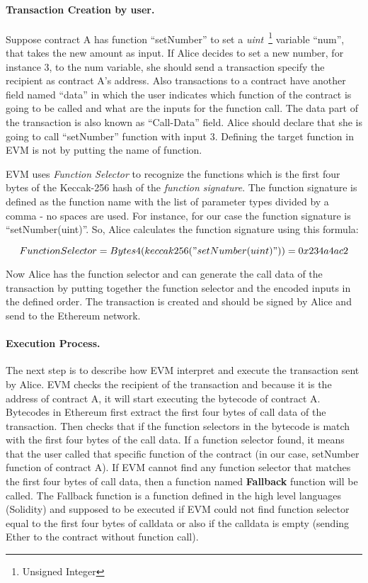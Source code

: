 \paragraph{Transaction Creation by user. }Suppose contract A has function ``setNumber'' to set a \textit{uint}~\footnote{Unsigned Integer} variable ``num'', that takes the new amount as input. If Alice decides to set a new number, for instance 3, to the num variable, she should send a transaction specify the recipient as contract A's address. Also transactions to a contract have another field named ``data'' in which the user indicates which function of the contract is going to be called and what are the inputs for the function call. The data part of the transaction is also known as ``Call-Data'' field. Alice should declare that she is going to call ``setNumber'' function with input 3. Defining the target function in EVM is not by putting the name of function. 

EVM uses \textit{Function Selector} to recognize the functions which is the first four bytes of the Keccak-256 hash of the \textit{function signature}. The function signature is defined as the function name with the list of parameter types divided by a comma - no spaces are used. For instance, for our case the function signature is ``setNumber(uint)''. So, Alice calculates the function signature using this formula:

\begin{equation}
    Function Selector = Bytes4(keccak256("setNumber(uint)")) = 0x234a4ac2
\end{equation}

Now Alice has the function selector and can generate the call data of the transaction by putting together the function selector and the encoded inputs in the defined order. The transaction is created and should be signed by Alice and send to the Ethereum network.

\paragraph{Execution Process. } 
The next step is to describe how EVM interpret and execute the transaction sent by Alice. EVM checks the recipient of the transaction and because it is the address of contract A, it will start executing the bytecode of contract A. Bytecodes in Ethereum first extract the first four bytes of call data of the transaction. Then checks that if the function selectors in the bytecode is match with the first four bytes of the call data. If a function selector found, it means that the user called that specific function of the contract (in our case, setNumber function of contract A). If EVM cannot find any function selector that matches the first four bytes of call data, then a function named \textbf{Fallback} function will be called. The Fallback function is a function defined in the high level languages (\eg Solidity) and supposed to be executed if EVM could not find function selector equal to the first four bytes of calldata or also if the calldata is empty (\ie sending Ether to the contract without function call). 


